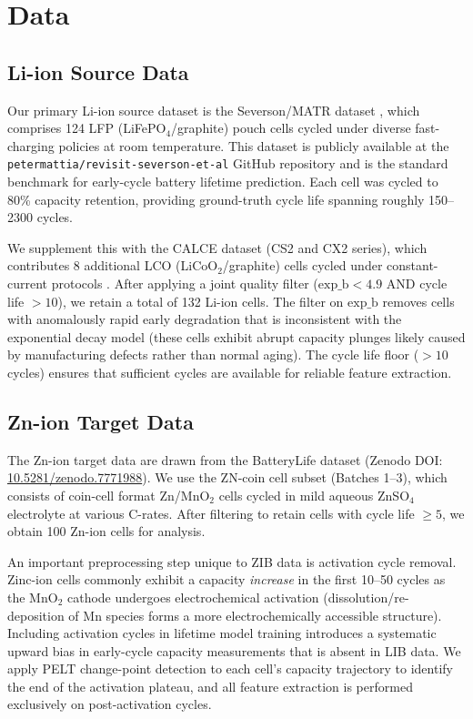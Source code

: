 \documentclass[12pt]{article}
\begin{document}
\section{Data}
\label{sec:data}

\subsection{Li-ion Source Data}

Our primary Li-ion source dataset is the Severson/MATR dataset \cite{severson2019},
which comprises 124 LFP (LiFePO$_4$/graphite) pouch cells cycled under diverse
fast-charging policies at room temperature. This dataset is publicly available at
the \texttt{petermattia/revisit-severson-et-al} GitHub repository and is the
standard benchmark for early-cycle battery lifetime prediction. Each cell was
cycled to 80\% capacity retention, providing ground-truth cycle life spanning
roughly 150--2300 cycles.

We supplement this with the CALCE dataset (CS2 and CX2 series), which
contributes 8 additional LCO (LiCoO$_2$/graphite) cells cycled under
constant-current protocols \cite{he2011calce}. After applying a joint
quality filter ($\text{exp\_b} < 4.9$ AND cycle life $> 10$), we retain a
total of 132 Li-ion cells. The filter on $\text{exp\_b}$ removes cells with
anomalously rapid early degradation that is inconsistent with the exponential
decay model (these cells exhibit abrupt capacity plunges likely caused by
manufacturing defects rather than normal aging). The cycle life floor
($> 10$ cycles) ensures that sufficient cycles are available for reliable
feature extraction.


\subsection{Zn-ion Target Data}

The Zn-ion target data are drawn from the BatteryLife dataset \cite{tan2024}
(Zenodo DOI: \href{https://doi.org/10.5281/zenodo.7771988}{10.5281/zenodo.7771988}).
We use the ZN-coin cell subset (Batches 1--3), which consists of coin-cell format
Zn/MnO$_2$ cells cycled in mild aqueous ZnSO$_4$ electrolyte at various
C-rates. After filtering to retain cells with cycle life $\geq 5$, we obtain
100 Zn-ion cells for analysis.

An important preprocessing step unique to ZIB data is activation cycle removal.
Zinc-ion cells commonly exhibit a capacity \emph{increase} in the first
10--50 cycles as the MnO$_2$ cathode undergoes electrochemical activation
(dissolution/re-deposition of Mn species forms a more electrochemically
accessible structure). Including activation cycles in lifetime model training
introduces a systematic upward bias in early-cycle capacity measurements that is
absent in LIB data. We apply PELT change-point detection \cite{truong2020, killick2012pelt} to
each cell's capacity trajectory to identify the end of the activation plateau,
and all feature extraction is performed exclusively on post-activation cycles.
\end{document}
